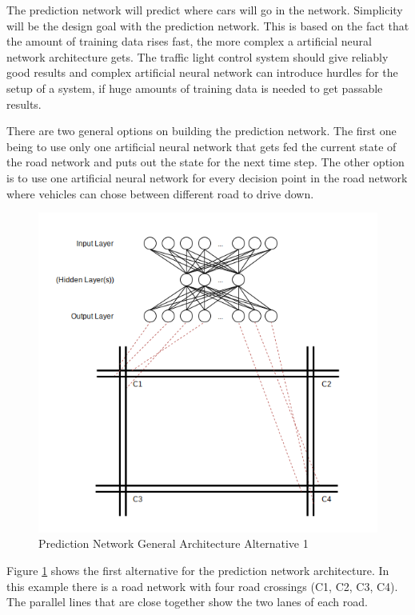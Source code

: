 The prediction network will predict where cars will go in the network. Simplicity will be the design goal with the prediction network. This is based on the fact that the amount of training data rises fast, the more complex a artificial neural network architecture gets. The traffic light control system should give reliably good results and complex artificial neural network can introduce hurdles for the setup of a system, if huge amounts of training data is needed to get passable results. 

There are two general options on building the prediction network. The first one being to use only one artificial neural network that gets fed the current state of the road network and puts out the state for the next time step. The other option is to use one artificial neural network for every decision point in the road network where vehicles can chose between different road to drive down.

\begin{figure}[!ht]
  \centering
  \includegraphics[width=16cm]{figures/predictionNetworkAlt1}
  \caption[Prediction Network General Architecture Alternative 1]{Prediction Network General Architecture Alternative 1 \protect\footnotemark}
  \label{predictionNetworkAlt1}
\end{figure}


Figure \ref{predictionNetworkAlt1} shows the first alternative for the prediction network architecture. In this example there is a road network with four road crossings (C1, C2, C3, C4). The parallel lines that are close together show the two lanes of each road. 


